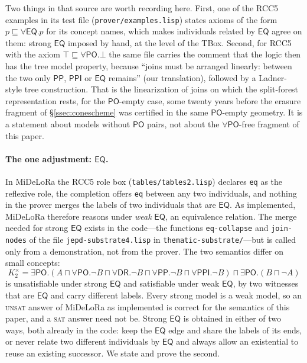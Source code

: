 \documentclass[11pt]{article}
\newcommand{\DR}{\mathsf{DR}}
\newcommand{\PO}{\mathsf{PO}}
\newcommand{\PP}{\mathsf{PP}}
\newcommand{\PPI}{\mathsf{PPI}}
\newcommand{\EQ}{\mathsf{EQ}}
\newcommand{\code}[1]{\texttt{#1}}
\theoremstyle{plain}
\theoremstyle{definition}
\begin{document}
Two things in that source are worth recording here. First, one of the RCC5
examples in its test file (\texttt{prover/examples.lisp}) states axioms of the
form $p\sqsubseteq\forall\EQ.p$ for its concept names, which makes individuals
related by $\EQ$ agree on them: strong $\EQ$ imposed by hand, at the level of
the TBox. Second, for RCC5 with the axiom $\top\sqsubseteq\forall\PO.\bot$ the
same file carries
the comment that the logic then has the tree model property, because ``joins
must be arranged linearly: between the two only $\PP$, $\PPI$ or $\EQ$
remains'' (our translation), followed by a Ladner-style tree construction.
That is the linearization of joins on which the split-forest representation
rests, for the $\PO$-empty case, some twenty years before the erasure fragment
of \S\ref{ssec:conescheme} was certified in the same $\PO$-empty geometry. It
is a statement about models without $\PO$ pairs, not about the
$\forall\PO$-free fragment of this paper.

\paragraph{The one adjustment: $\EQ$.} In MiDeLoRa the RCC5 role box
(\texttt{tables/tables2.lisp}) declares \code{eq} as the reflexive role, the
completion offers
\code{eq} between any two individuals, and nothing in the prover merges the
labels of two individuals that are $\EQ$. As implemented, MiDeLoRa therefore
reasons under \emph{weak} $\EQ$, an equivalence relation. The merge needed for
strong $\EQ$ exists in the code---the functions \code{eq-collapse} and
\code{join-nodes} of the file \texttt{jepd-substrate4.lisp} in
\texttt{thematic-substrate/}---but is called only from a demonstration, not
from the prover. The two semantics differ on small
concepts:
\[
K_2^{\times}=\exists\PO.(A\sqcap\forall\PO.\neg B\sqcap\forall\DR.\neg B\sqcap
\forall\PP.\neg B\sqcap\forall\PPI.\neg B)\sqcap\exists\PO.(B\sqcap\neg A)
\]
is unsatisfiable under strong $\EQ$ and satisfiable under weak $\EQ$, by two
witnesses that are $\EQ$ and carry different labels. Every strong model is a
weak model, so an \textsc{unsat} answer of MiDeLoRa as implemented is correct
for the semantics of this paper, and a \textsc{sat} answer need not be. Strong
$\EQ$ is obtained in either of two ways, both already in the code: keep the
$\EQ$ edge and share the labels of its ends, or never relate two different
individuals by $\EQ$ and always allow an existential to reuse an existing
successor. We state and prove the second.
\end{document}
